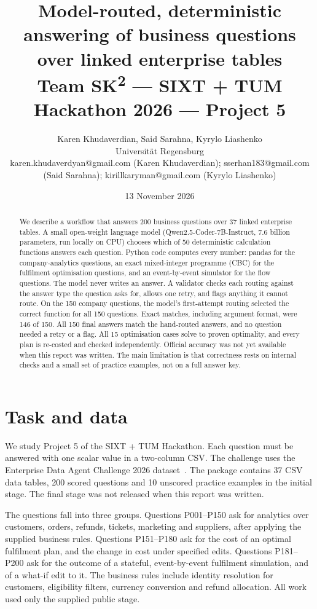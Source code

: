 \documentclass[11pt,a4paper]{article}
\title{Model-routed, deterministic answering of business questions over linked enterprise tables\\
  \large Team SK\textsuperscript{2} --- SIXT + TUM Hackathon 2026 --- Project 5}
\author{Karen Khudaverdian, Said Sarahna, Kyrylo Liashenko\\
  \small Universit\"at Regensburg\\
  \small karen.khudaverdyan@gmail.com (Karen Khudaverdian); sserhan183@gmail.com (Said Sarahna); kirillkaryman@gmail.com (Kyrylo Liashenko)}
\date{13 November 2026}
\begin{document}
\maketitle

\begin{abstract}
We describe a workflow that answers 200 business questions over 37 linked
enterprise tables. A small open-weight language model (Qwen2.5-Coder-7B-Instruct,
7.6 billion parameters, run locally on CPU) chooses which of 50 deterministic
calculation functions answers each question. Python code computes every number:
pandas for the company-analytics questions, an exact mixed-integer programme
(CBC) for the fulfilment optimisation questions, and an event-by-event simulator
for the flow questions. The model never writes an answer. A validator checks
each routing against the answer type the question asks for, allows one retry,
and flags anything it cannot route. On the 150 company questions, the model's first-attempt routing selected the correct function for all 150 questions. Exact matches, including argument format, were 146 of 150. All 150 final answers match the hand-routed answers, and no question needed a retry or a flag.
All 15 optimisation cases solve to proven optimality, and every plan is re-costed
and checked independently. Official accuracy was not yet available when this
report was written. The main limitation is that correctness rests on internal
checks and a small set of practice examples, not on a full answer key.
\end{abstract}

\section{Task and data}
We study Project 5 of the SIXT + TUM Hackathon. Each question must be answered
with one scalar value in a two-column CSV. The challenge uses the Enterprise
Data Agent Challenge 2026 dataset~\cite{tzachristas2026enterprise}. The package
contains 37 CSV data tables, 200 scored questions and 10 unscored practice
examples in the initial stage. The final stage was not released when this
report was written.

The questions fall into three groups. Questions P001--P150 ask for analytics
over customers, orders, refunds, tickets, marketing and suppliers, after applying
the supplied business rules. Questions P151--P180 ask for the cost of an
optimal fulfilment plan, and the change in cost under specified edits. Questions
P181--P200 ask for the outcome of a stateful, event-by-event fulfilment
simulation, and of a what-if edit to it. The business rules include identity
resolution for customers, eligibility filters, currency conversion and refund
allocation. All work used only the supplied public stage.
\end{document}
